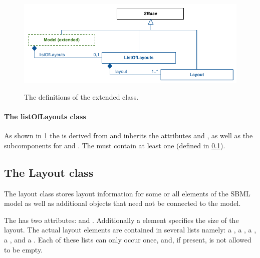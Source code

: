 \begin{figure}[!h]
\includegraphics{uml/layout-extended-model-uml}\\
\caption{The definitions of the extended \Model class.}
\label{figure:extendedmodel}
\end{figure}

\paragraph{The listOfLayouts class}
\label{listoflayouts-class}
As shown in \ref{figure:extendedmodel} the \ListOfLayouts is derived from 
\SBase and inherits the attributes  and , 
as well as the subcomponents for \Annotation and \Notes. The 
\ListOfLayouts must contain at least one \Layout (defined in 
\ref{layout-class}). 


\subsection{The Layout class}
\label{layout-class}
The layout class stores layout information for some or all elements of 
the SBML model as well as additional objects that need not be connected 
to the model. 

The \LayoutClass has two attributes:  and 
. Additionally a \Dimensions element specifies the size of 
the layout. The actual layout elements are contained in several lists 
namely: a \ListOfCompartmentGlyphs, a \ListOfSpeciesGlyphs, a 
\ListOfReactionGlyphs, a \ListOfTextGlyphs, and a 
\ListOfAdditionalGraphicalObjects. Each of these lists can only occur 
once, and, if present, is not allowed to be empty. 


